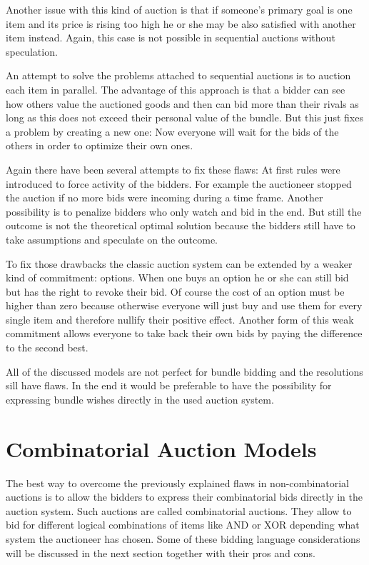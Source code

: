 \documentclass[a4paper]{paper}
\begin{document}
Another issue with this kind of auction is that if someone's primary goal is one item and its price is rising too high he or she may be also satisfied with another item instead. Again, this case is not possible in sequential auctions without speculation.

An attempt to solve the problems attached to sequential auctions is to auction each item in parallel. The advantage of this approach is that a bidder can see how others value the auctioned goods and then can bid more than their rivals as long as this does not exceed their personal value of the bundle. But this just fixes a problem by creating a new one: Now everyone will wait for the bids of the others in order to optimize their own ones.

Again there have been several attempts to fix these flaws: At first rules were introduced to force activity of the bidders. For example the auctioneer stopped the auction if no more bids were incoming during a time frame. Another possibility is to penalize bidders who only watch and bid in the end. But still the outcome is not the theoretical optimal solution because the bidders still have to take assumptions and speculate on the outcome.

To fix those drawbacks the classic auction system can be extended by a weaker kind of commitment: options. When one buys an option he or she can still bid but has the right to revoke their bid. Of course the cost of an option must be higher than zero because otherwise everyone will just buy and use them for every single item and therefore nullify their positive effect. Another form of this weak commitment allows everyone to take back their own bids by paying the difference to the second best.~\cite[Chapter~1.3]{San02}

All of the discussed models are not perfect for bundle bidding and the resolutions sill have flaws. In the end it would be preferable to have the possibility for expressing bundle wishes directly in the used auction system.

\section{Combinatorial Auction Models}

The best way to overcome the previously explained flaws in non-combinatorial auctions is to allow the bidders to express their combinatorial bids directly in the auction system. Such auctions are called combinatorial auctions. They allow to bid for different logical combinations of items like AND or XOR depending what system the auctioneer has chosen. Some of these bidding language considerations will be discussed in the next section together with their pros and cons.
\end{document}
